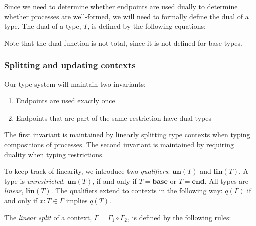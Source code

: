 \documentclass[a4paper]{article}
\newcommand{\Tend}{\mathbf{end}}
\newcommand{\Tbase}{\mathbf{base}}
\newcommand{\Tin}[1]{{?}.#1}
\newcommand{\Tout}[1]{{!}.#1}
\newcommand{\hastype}[2]{#1 : #2}
\newcommand{\un}[1]{\mathbf{un}(#1)}
\newcommand{\lin}[1]{\mathbf{lin}(#1)}
\newcommand{\Cempty}{\varnothing}
\newcommand{\Cadd}[2]{#1, #2}
\newcommand{\Csplit}[2]{#1 \circ #2}
\newcommand{\dual}[1]{\overline{#1}}
\begin{document}
Since we need to determine whether endpoints are used dually to determine whether processes are well-formed, we will need to formally define the dual of a type.
The dual of a type, \( \dual{T} \), is defined by the following equations:
Note that the dual function is not total, since it is not defined for base types.

\subsubsection{Splitting and updating contexts}
Our type system will maintain two invariants:
\begin{enumerate}
\item Endpoints are used exactly once
\item Endpoints that are part of the same restriction have dual types
\end{enumerate}
The first invariant is maintained by linearly splitting type contexts when typing compositions of processes.
The second invariant is maintained by requiring duality when typing restrictions.

To keep track of linearity, we introduce two \emph{qualifiers}: \( \un{T} \) and \( \lin{T} \).
A type is \emph{unrestricted}, \( \un{T} \), if and only if \( T = \Tbase \) or \( T = \Tend \).
All types are \emph{linear}, \( \lin{T} \).
The qualifiers extend to contexts in the following way: \( q(\Gamma) \) if and only if \( \hastype{x}{T} \in \Gamma \) implies \( q(T) \).

The \emph{linear split} of a context, \( \Gamma = \Csplit{\Gamma_1}{\Gamma_2} \), is defined by the following rules:
\end{document}
